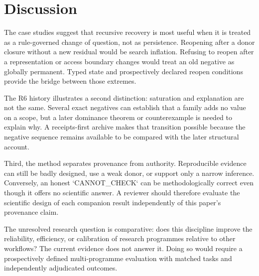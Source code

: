 \section{Discussion}

The case studies suggest that recursive recovery is most useful when it is treated as a rule-governed change of question, not as persistence. Reopening after a donor closure without a new residual would be search inflation. Refusing to reopen after a representation or access boundary changes would treat an old negative as globally permanent. Typed state and prospectively declared reopen conditions provide the bridge between those extremes.

The R6 history illustrates a second distinction: saturation and explanation are not the same. Several exact negatives can establish that a family adds no value on a scope, but a later dominance theorem or counterexample is needed to explain why. A receipts-first archive makes that transition possible because the negative sequence remains available to be compared with the later structural account.

Third, the method separates provenance from authority. Reproducible evidence can still be badly designed, use a weak donor, or support only a narrow inference. Conversely, an honest `CANNOT_CHECK` can be methodologically correct even though it offers no scientific answer. A reviewer should therefore evaluate the scientific design of each companion result independently of this paper's provenance claim.

The unresolved research question is comparative: does this discipline improve the reliability, efficiency, or calibration of research programmes relative to other workflows? The current evidence does not answer it. Doing so would require a prospectively defined multi-programme evaluation with matched tasks and independently adjudicated outcomes.